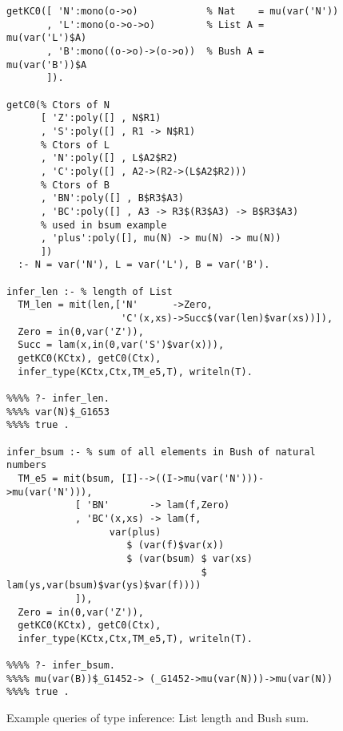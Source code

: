 \documentclass[runningheads,a4paper]{llncs}
\newcommand{\TODO}[1]{\textcolor{magenta}{TODO: #1}}
\begin{document}


\begin{figure}\small
\begin{verbatim}
getKC0([ 'N':mono(o->o)            % Nat    = mu(var('N'))
       , 'L':mono(o->o->o)         % List A = mu(var('L')$A)
       , 'B':mono((o->o)->(o->o))  % Bush A = mu(var('B'))$A
       ]).

getC0(% Ctors of N
      [ 'Z':poly([] , N$R1)
      , 'S':poly([] , R1 -> N$R1)
      % Ctors of L
      , 'N':poly([] , L$A2$R2)
      , 'C':poly([] , A2->(R2->(L$A2$R2)))
      % Ctors of B
      , 'BN':poly([] , B$R3$A3)
      , 'BC':poly([] , A3 -> R3$(R3$A3) -> B$R3$A3)
      % used in bsum example
      , 'plus':poly([], mu(N) -> mu(N) -> mu(N))
      ])
  :- N = var('N'), L = var('L'), B = var('B').

infer_len :- % length of List
  TM_len = mit(len,['N'      ->Zero,
                    'C'(x,xs)->Succ$(var(len)$var(xs))]),
  Zero = in(0,var('Z')),
  Succ = lam(x,in(0,var('S')$var(x))),
  getKC0(KCtx), getC0(Ctx),
  infer_type(KCtx,Ctx,TM_e5,T), writeln(T).

%%%% ?- infer_len.
%%%% var(N)$_G1653
%%%% true .

infer_bsum :- % sum of all elements in Bush of natural numbers
  TM_e5 = mit(bsum, [I]-->((I->mu(var('N')))->mu(var('N'))),
            [ 'BN'       -> lam(f,Zero)
            , 'BC'(x,xs) -> lam(f,
                  var(plus)
                     $ (var(f)$var(x))
                     $ (var(bsum) $ var(xs)
                                  $ lam(ys,var(bsum)$var(ys)$var(f))))
            ]),
  Zero = in(0,var('Z')),
  getKC0(KCtx), getC0(Ctx),
  infer_type(KCtx,Ctx,TM_e5,T), writeln(T).

%%%% ?- infer_bsum.
%%%% mu(var(B))$_G1452-> (_G1452->mu(var(N)))->mu(var(N))
%%%% true .
\end{verbatim}
\caption{Example queries of type inference: List length and Bush sum.}
\label{fig:TIexample}
\end{figure}
\end{document}

